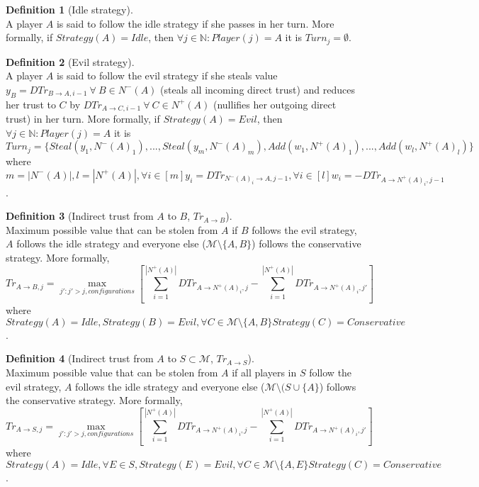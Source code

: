 \documentclass[11pt]{article}
\theoremstyle{definition}
\newtheorem{definition}{Definition}[section]
\theoremstyle{corollary}
\theoremstyle{lemma}
\begin{document}
      \begin{definition}[Idle strategy] \ \\
         A player $A$ is said to follow the idle strategy if she passes in her turn. More formally, if $Strategy(A) =
         Idle$, then $\forall j \in \mathbb{N} : Player(j) = A$ it is $Turn_j = \emptyset$.
      \end{definition}
      \begin{definition}[Evil strategy] \ \\
         A player $A$ is said to follow the evil strategy if she steals value $y_B = DTr_{B \rightarrow A, i-1} \:
         \forall \: B \in N^{-}(A)$ (steals all incoming direct trust) and reduces her trust to $C$ by
         $DTr_{A \rightarrow C, i-1} \: \forall \: C \in N^{+}(A)$ (nullifies her outgoing direct trust) in her turn.
         More formally, if $Strategy(A) = Evil$, then $\forall j \in \mathbb{N} : Player(j) = A$ it is $Turn_j =
         \{Steal(y_1,N^{-}(A)_1),...,Steal(y_m,N^{-}(A)_m), Add(w_1,N^{+}(A)_1),...,Add(w_l,N^{+}(A)_l)\}$ where
         $m = |N^{-}(A)|, l = |N^{+}(A)|, \forall i \in [m] y_i = DTr_{N^{-}(A)_i \rightarrow A,j-1}, \forall i \in [l]
         w_i = -DTr_{A \rightarrow N^{+}(A)_i,j-1}$.
      \end{definition}
      \begin{definition}[Indirect trust from $A$ to $B$, $Tr_{A \rightarrow B}$] \ \\
         Maximum possible value that can be stolen from $A$ if $B$ follows the evil strategy, $A$ follows the idle strategy
         and everyone else ($\mathcal{M} \setminus \{A,B\}$) follows the conservative strategy. More formally,
         $$Tr_{A \rightarrow B, j} = \max\limits_{j' : j' > j, configurations}{[\sum\limits_{i=1}^{|N^{+}(A)|}DTr_{A 
         \rightarrow N^{+}(A)_i,j}-\sum\limits_{i=1}^{|N^{+}(A)|}DTr_{A \rightarrow N^{+}(A)_i,j'}]}$$ where
         $Strategy(A) = Idle, Strategy(B) = Evil, \forall C \in \mathcal{M} \setminus \{A,B\} Strategy(C) = Conservative$.
      \end{definition}
      \begin{definition}[Indirect trust from $A$ to $S \subset \mathcal{M}$, $Tr_{A \rightarrow S}$] \ \\
         Maximum possible value that can be stolen from $A$ if all players in $S$ follow the evil strategy, $A$ follows
         the idle strategy and everyone else ($\mathcal{M} \setminus (S \cup \{A\}$) follows the conservative strategy. More
         formally, $$Tr_{A \rightarrow S, j} = \max\limits_{j' : j' > j, configurations}{[\sum\limits_{i=1}^{|N^{+}(A)|}
         DTr_{A \rightarrow N^{+}(A)_i,j}-\sum\limits_{i=1}^{|N^{+}(A)|}DTr_{A \rightarrow N^{+}(A)_i,j'}]}$$ where
         $Strategy(A) = Idle, \forall E \in S, Strategy(E) = Evil,
         \forall C \in \mathcal{M} \setminus \{A,E\} Strategy(C) = Conservative$.
      \end{definition}
\end{document}
